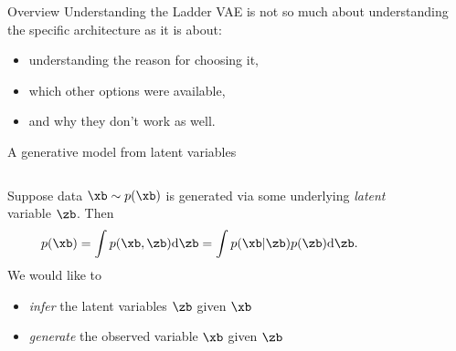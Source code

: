 \begin{frame}{Overview}
    Understanding the Ladder VAE is not so much about understanding the specific architecture as it is about:
    \begin{itemize}
        \item[a)] understanding the reason for choosing it,
        \item[b)] which other options were available,
        \item[c)] and why they don't work as well.
    \end{itemize} 
\end{frame}


\begin{frame}{A generative model from latent variables}
    \begin{columns}[c]
        \begin{column}{.7\textwidth}
            Suppose data $\xb \sim p (\xb)$ is generated via some underlying \textit{latent} variable $\zb$. Then
            \begin{equation}
                p(\xb) = \int p(\xb,\zb) \text{d}\zb = \int p(\xb|\zb)p(\zb) \text{d}\zb.
            \end{equation}
            We would like to 
            \begin{itemize}
                \item[a)] \textit{infer} the latent variables $\zb$ given $\xb$
                \item[b)] \textit{generate} the observed variable $\xb$ given $\zb$
            \end{itemize}
        \end{column}
        \begin{column}{.3\textwidth}
            \begin{figure}[\textwidth]
            \end{figure}
        \end{column}
    \end{columns}
\end{frame}


